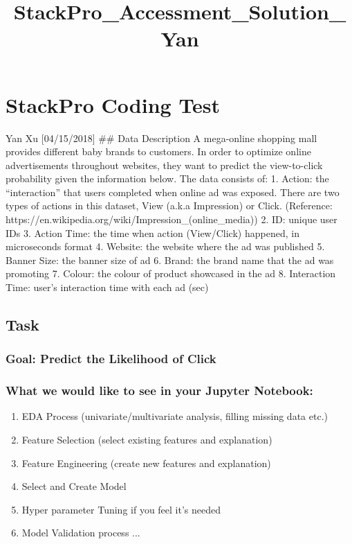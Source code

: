 \documentclass[11pt]{article}
\title{StackPro\_Accessment\_Solution\_Yan}
\providecommand{\tightlist}{%
      \setlength{\itemsep}{0pt}\setlength{\parskip}{0pt}}
\begin{document}
    
    
    \maketitle
    
    

    
    \section{StackPro Coding Test}\label{stackpro-coding-test}

Yan Xu {[}04/15/2018{]} \#\# Data Description A mega-online shopping
mall provides different baby brands to customers. In order to optimize
online advertisements throughout websites, they want to predict the
view-to-click probability given the information below. The data consists
of: 1. Action: the ``interaction'' that users completed when online ad
was exposed. There are two types of actions in this dataset, View (a.k.a
Impression) or Click. (Reference:
https://en.wikipedia.org/wiki/Impression\_(online\_media)) 2. ID: unique
user IDs 3. Action Time: the time when action (View/Click) happened, in
microseconds format 4. Website: the website where the ad was published
5. Banner Size: the banner size of ad 6. Brand: the brand name that the
ad was promoting 7. Colour: the colour of product showcased in the ad 8.
Interaction Time: user's interaction time with each ad (sec)

\subsection{Task}\label{task}

\subsubsection{Goal: Predict the Likelihood of
Click}\label{goal-predict-the-likelihood-of-click}

\subsubsection{What we would like to see in your Jupyter
Notebook:}\label{what-we-would-like-to-see-in-your-jupyter-notebook}

\begin{enumerate}
\def\labelenumi{\arabic{enumi}.}
\tightlist
\item
  EDA Process (univariate/multivariate analysis, filling missing data
  etc.)
\item
  Feature Selection (select existing features and explanation)
\item
  Feature Engineering (create new features and explanation)
\item
  Select and Create Model
\item
  Hyper parameter Tuning if you feel it's needed
\item
  Model Validation process ...
\end{enumerate}
\end{document}
